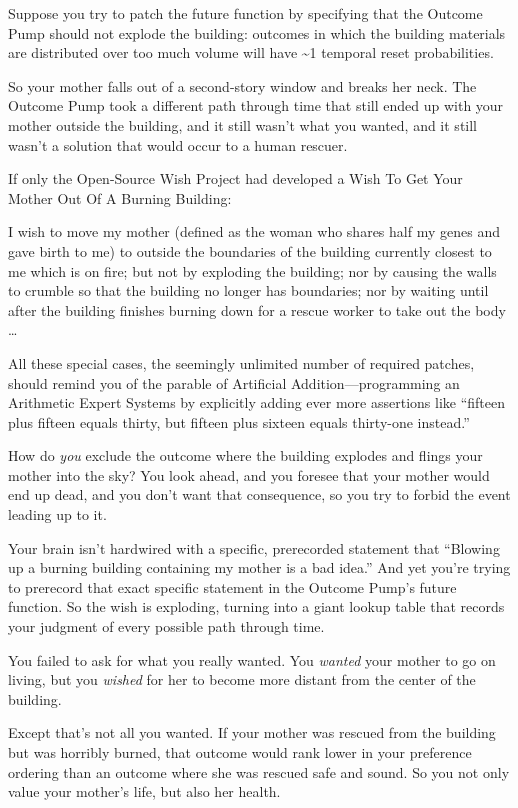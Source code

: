 {
 Suppose you try to patch the future function by specifying that
the Outcome Pump should not explode the building: outcomes in which the
building materials are distributed over too much volume will have \~{}1
temporal reset probabilities.}

{
 So your mother falls out of a second-story window and breaks her
neck. The Outcome Pump took a different path through time that still
ended up with your mother outside the building, and it still
wasn't what you wanted, and it still
wasn't a solution that would occur to a human rescuer.}

{
 If only the Open-Source Wish Project had developed a Wish To Get
Your Mother Out Of A Burning Building:}

{
 I wish to move my mother (defined as the woman who shares half my
genes and gave birth to me) to outside the boundaries of the building
currently closest to me which is on fire; but not by exploding the
building; nor by causing the walls to crumble so that the building no
longer has boundaries; nor by waiting until after the building finishes
burning down for a rescue worker to take out the body \ldots}

{
 All these special cases, the seemingly unlimited number of
required patches, should remind you of the parable of Artificial
Addition---programming an Arithmetic Expert Systems by explicitly
adding ever more assertions like ``fifteen plus
fifteen equals thirty, but fifteen plus sixteen equals thirty-one
instead.''}

{
 How do \textit{you} exclude the outcome where the building
explodes and flings your mother into the sky? You look ahead, and you
foresee that your mother would end up dead, and you
don't want that consequence, so you try to forbid the
event leading up to it.}

{
 Your brain isn't hardwired with a specific,
prerecorded statement that ``Blowing up a burning
building containing my mother is a bad idea.'' And
yet you're trying to prerecord that exact specific
statement in the Outcome Pump's future function. So the
wish is exploding, turning into a giant lookup table that records your
judgment of every possible path through time.}

{
 You failed to ask for what you really wanted. You \textit{wanted}
your mother to go on living, but you \textit{wished} for her to become
more distant from the center of the building.}

{
 Except that's not all you wanted. If your mother
was rescued from the building but was horribly burned, that outcome
would rank lower in your preference ordering than an outcome where she
was rescued safe and sound. So you not only value your
mother's life, but also her health.}

